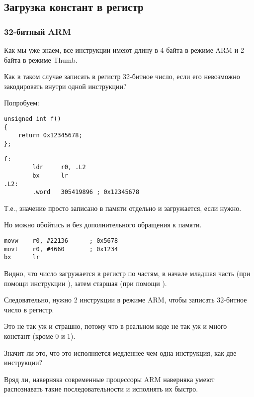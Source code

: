 ﻿\subsection{Загрузка констант в регистр}
\label{ARM_big_constants}

\subsubsection{32-битный ARM}
\label{ARM_big_constants_loading}

Как мы уже знаем, все инструкции имеют длину в 4 байта в режиме ARM и 2 байта в режиме Thumb.

Как в таком случае записать в регистр 32-битное число, если его невозможно закодировать
внутри одной инструкции?

Попробуем:

\begin{lstlisting}[style=customc]
unsigned int f()
{
	return 0x12345678;
};
\end{lstlisting}

\begin{lstlisting}[caption=GCC 4.6.3 -O3 \ARMMode,style=customasmARM]
f:
        ldr     r0, .L2
        bx      lr
.L2:
        .word   305419896 ; 0x12345678
\end{lstlisting}

Т.е., значение  просто записано в памяти отдельно и загружается, если нужно.

Но можно обойтись и без дополнительного обращения к памяти.

\begin{lstlisting}[caption=GCC 4.6.3 -O3 -march{=}armv7-a (\ARMMode),style=customasmARM]
movw    r0, #22136      ; 0x5678
movt    r0, #4660       ; 0x1234
bx      lr
\end{lstlisting}

Видно, что число загружается в регистр по частям, в начале младшая часть 
(при помощи инструкции ), затем старшая (при помощи ).

Следовательно, нужно 2 инструкции в режиме ARM, чтобы записать 32-битное число в регистр.

Это не так уж и страшно, потому что в реальном коде не так уж и много констант (кроме 0 и 1).

Значит ли это, что это исполняется медленнее чем одна инструкция, как две инструкции?

Вряд ли, наверняка современные процессоры ARM наверняка умеют распознавать такие 
последовательности и исполнять их быстро.

